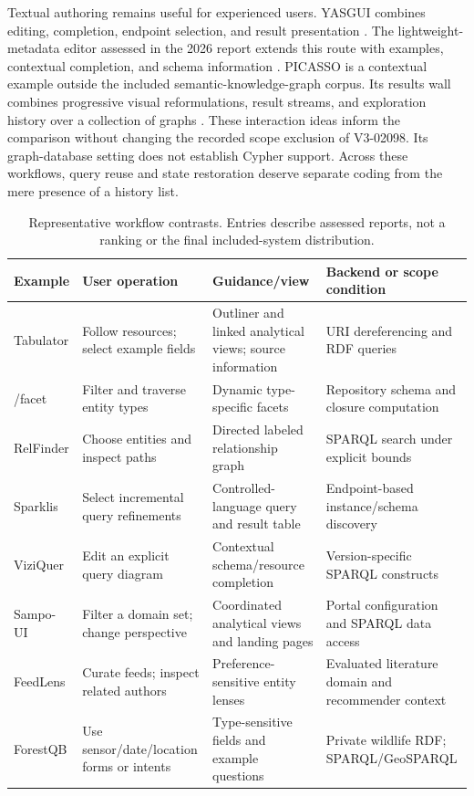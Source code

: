 \documentclass[manuscript,review,screen]{acmart}
\begin{document}
Textual authoring remains useful for experienced users. YASGUI combines editing, completion, endpoint selection, and result presentation \citep{2013_Rietveld_YASGUI_Not}. The lightweight-metadata editor assessed in the 2026 report extends this route with examples, contextual completion, and schema information \citep{2025_Emonet_A_User-Friendly}. PICASSO is a contextual example outside the included semantic-knowledge-graph corpus. Its results wall combines progressive visual reformulations, result streams, and exploration history over a collection of graphs \citep{2017_Huang_PICASSO_exploratory}. These interaction ideas inform the comparison without changing the recorded scope exclusion of V3-02098. Its graph-database setting does not establish Cypher support. Across these workflows, query reuse and state restoration deserve separate coding from the mere presence of a history list.

\begin{table}[htbp]
\centering\small
\caption{Representative workflow contrasts. Entries describe assessed reports, not a ranking or the final included-system distribution.}
\label{tab:workflows}
\begin{tabularx}{\linewidth}{L{24mm} Y Y Y}
\toprule Example & User operation & Guidance/view & Backend or scope condition\\\midrule
Tabulator & Follow resources; select example fields & Outliner and linked analytical views; source information & URI dereferencing and RDF queries\\
/facet & Filter and traverse entity types & Dynamic type-specific facets & Repository schema and closure computation\\
RelFinder & Choose entities and inspect paths & Directed labeled relationship graph & SPARQL search under explicit bounds\\
Sparklis & Select incremental query refinements & Controlled-language query and result table & Endpoint-based instance/schema discovery\\
ViziQuer & Edit an explicit query diagram & Contextual schema/resource completion & Version-specific SPARQL constructs\\
Sampo-UI & Filter a domain set; change perspective & Coordinated analytical views and landing pages & Portal configuration and SPARQL data access\\
FeedLens & Curate feeds; inspect related authors & Preference-sensitive entity lenses & Evaluated literature domain and recommender context\\
ForestQB & Use sensor/date/location forms or intents & Type-sensitive fields and example questions & Private wildlife RDF; SPARQL/GeoSPARQL\\\bottomrule
\end{tabularx}
\end{table}
\end{document}
